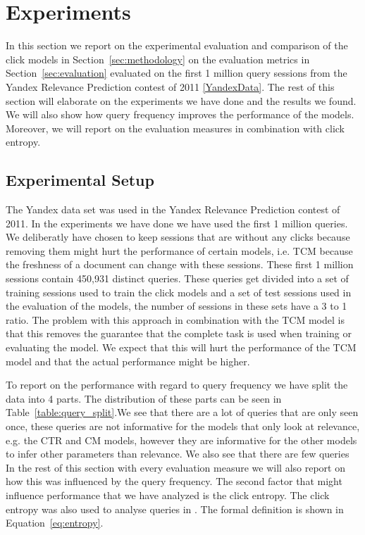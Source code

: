 \section{Experiments}
In this section we report on the experimental evaluation and comparison of the click models in Section~\ref{sec:methodology} on the evaluation metrics in Section~\ref{sec:evaluation} evaluated on the first 1 million query sessions from the Yandex Relevance Prediction contest of 2011 \ref{YandexData}. The rest of this section will elaborate on the experiments we have done and the results we found. We will also show how query frequency improves the performance of the models. Moreover, we will report on the evaluation measures in combination with click entropy.

\subsection{Experimental Setup}
The Yandex data set was used in the Yandex Relevance Prediction contest of 2011. In the experiments we have done we have used the first 1 million queries. We deliberatly have chosen to keep sessions that are without any clicks because removing them might hurt the performance of certain models, i.e. TCM because the freshness of a document can change with these sessions. These first 1 million sessions contain 450,931 distinct queries. These queries get divided into a set of training sessions used to train the click models and a set of test sessions used in the evaluation of the models, the number of sessions in these sets have a 3 to 1 ratio. The problem with this approach in combination with the TCM model is that this removes the guarantee that the complete task is used when training or evaluating the model. We expect that this will hurt the performance of the TCM model and that the actual performance might be higher. 

To report on the performance with regard to query frequency we have split the data into 4 parts. The distribution of these parts can be seen in Table~\ref{table:query_split}.We see that there are a lot of queries that are only seen once, these queries are not informative for the models that only look at relevance, e.g. the CTR and CM models, however they are informative for the other models to infer other parameters than relevance. We also see that there are few queries In the rest of this section with every evaluation measure we will also report on how this was influenced by the query frequency. The second factor that might influence performance that we have analyzed is the click entropy. The click entropy was also used to analyse queries in \cite{dou2008}. The formal definition is shown in Equation~\ref{eq:entropy}.

